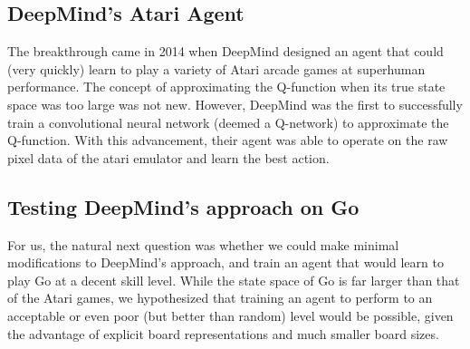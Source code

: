 \subsection{DeepMind's Atari Agent}
The breakthrough came in 2014 when DeepMind designed an agent that could (very quickly) learn to play a variety of Atari arcade games at superhuman performance. The concept of approximating the Q-function when its true state space was too large was not new. However, DeepMind was the first to successfully train a convolutional neural network (deemed a Q-network) to approximate the Q-function. With this advancement, their agent was able to operate on the raw pixel data of the atari emulator and learn the best action.

\subsection{Testing DeepMind's approach on Go}
For us, the natural next question was whether we could make minimal modifications to DeepMind's approach, and train an agent that would learn to play Go at a decent skill level. While the state space of Go is far larger than that of the Atari games, we hypothesized that training an agent to perform to an acceptable or even poor (but better than random) level would be possible, given the advantage of explicit board representations and much smaller board sizes.
